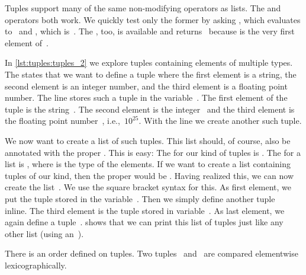 Tuples support many of the same non-modifying operators as lists.
The  and  operators both work.
We quickly test only the former by asking , which evaluates to~ and , which is~.
The , too, is available and  returns~ because  is the very first element of~.
%
\begin{sloppypar}%
In \cref{lst:tuples:tuples_2} we explore tuples containing elements of multiple types.
The   states that we want to define a tuple where the first element is a string, the second element is an integer number, and the third element is a floating point number.
The line  stores such a tuple in the variable~.
The first element of the tuple is the string~.
The second element is the integer~ and the third element is the floating point number~, i.e.,~$10^{25}$.
With the line  we create another such tuple.%
\end{sloppypar}%
%
\begin{sloppypar}%
We now want to create a list of such tuples.
This list should, of course, also be annotated with the proper .
This is easy:
The  for our kind of tuples is .
The  for a list is , where  is the type of the elements.
If we want to create a list containing tuples of our kind, then the proper  would be .
Having realized this, we can now create the list~.
We use the square bracket syntax for this.
As first element, we put the tuple stored in the variable~.
Then we simply define another tuple~ inline.
The third element is the tuple stored in variable~.
As last element, we again define a tuple~.
 shows that we can print this list of tuples just like any other list (using an~).%
\end{sloppypar}%
%
There is an order defined on tuples.
Two tuples~ and~ are compared elementwise lexicographically.
